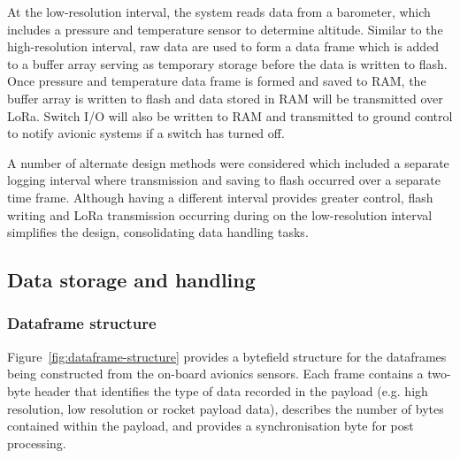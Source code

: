 At the low-resolution interval, the system reads data from a barometer, which includes a pressure and temperature sensor to determine altitude. Similar to the high-resolution interval, raw data are used to form a data frame which is added to a buffer array serving as temporary storage before the data is written to flash. Once pressure and temperature data frame is formed and saved to RAM, the buffer array is written to flash and data stored in RAM will be transmitted over LoRa. Switch I/O will also be written to RAM and transmitted to ground control to notify avionic systems if a switch has turned off.  

A number of alternate design methods were considered which included a separate logging interval where transmission and saving to flash occurred over a separate time frame. Although having a different interval provides greater control, flash writing and LoRa transmission occurring during on the low-resolution interval simplifies the design, consolidating data handling tasks.  

\subsection{Data storage and handling}
\subsubsection{Dataframe structure}\label{sec:dataframe-structure}
Figure~\ref{fig:dataframe-structure} provides a bytefield structure for the dataframes being constructed from the on-board avionics sensors. Each frame contains a two-byte header that identifies the type of data recorded in the payload (e.g. high resolution, low resolution or rocket payload data), describes the number of bytes contained within the payload, and provides a synchronisation byte for post processing.\\[0.5em]


